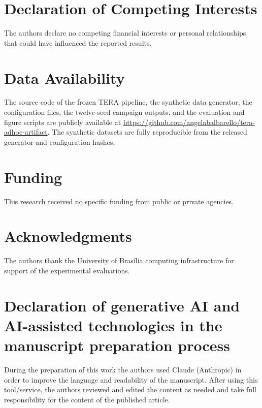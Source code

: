 \documentclass[a4paper,fleqn]{cas-dc}
\begin{document}
\section*{Declaration of Competing Interests}
The authors declare no competing financial interests or personal
relationships that could have influenced the reported results.
\section*{Data Availability}
{\color{\revcolor}The source code of the frozen TERA pipeline, the synthetic data generator, the
configuration files, the twelve-seed campaign outputs, and the evaluation and
figure scripts are publicly available at
\url{https://github.com/angelabalbarello/tera-adhoc-artifact}. The synthetic
datasets are fully reproducible from the released generator and configuration
hashes.}
\section*{Funding}
This research received no specific funding from public or private agencies.
\section*{Acknowledgments}
The authors thank the University of Bras\'ilia computing infrastructure
for support of the experimental evaluations.
\begin{sloppypar}
\section*{Declaration of generative AI and AI-assisted technologies in the
manuscript preparation process}
{\color{\revcolor}During the preparation of this work the authors used Claude
(Anthropic) in order to improve the language and readability of the
manuscript. After using this tool/service, the authors reviewed and edited
the content as needed and take full responsibility for the content of the
published article.}
\end{sloppypar}


\end{document}
